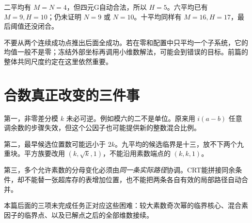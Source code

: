 二平均有 $M=N=4$，但四元G自动合法，所以 $H=5$。六平均已有 $M=9,H=10$；仍未证明 $N=9$ 或 $N=10$。十平均同样有 $M=16,H=17$，最后阈值还没闭合。

不要从两个连续成功点推出后面全成功。若在零和配置中只平均一个子系统，它的均值一般不是零；冻结外部坐标再调用小维数解法，可能会到错误的目标。前篇的整体共同尺度约定在这里依然重要。

\section{合数真正改变的三件事}
第一，非零差分模 $k$ 未必可逆。例如模六的二不是单位。原来用 $i(a-b)$ 任意调余数的步骤失效，但这个公因子也可能提供新的整数混合比例。

第二，最早候选位置数可能远小于 $2k$。九平均的候选临界是十三，放不下两个九重块。平方族要改用 $(k,\sqrt k,1)$，不能沿用素数端点的 $(k,k,1)$。

第三，多个允许素数的分母变化必须由\emph{同一条实际路径}协调。CRT能拼接同余条件，却不能替一张超库存的表增加位置，也不能把两条各自有效的局部路径自动合并。

本篇后面的三项未完成任务正对应这些困难：较大素数奇次幂的临界核心、混合素因子的临界点、以及已解点之后的全部维数接续。
